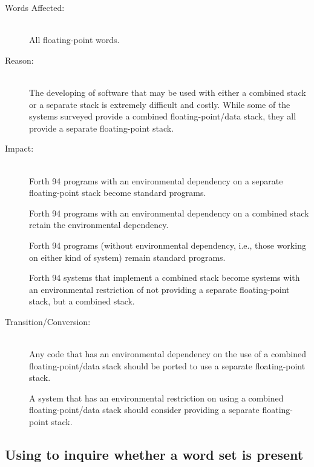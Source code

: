 \begin{description}
\item[Words Affected:] ~\\
	All floating-point words.

\item[Reason:] ~\\
	The developing of software that may be used with either a combined
	stack or a separate stack is extremely difficult and costly.  While
	some of the systems surveyed provide a combined floating-point/data
	stack, they all provide a separate floating-point stack.

\item[Impact:] ~\\
	Forth 94 programs with an environmental dependency on a separate
	floating-point stack become standard programs.

	Forth 94 programs with an environmental dependency on a combined
	stack retain the environmental dependency.

	Forth 94 programs (without environmental dependency, i.e., those
	working on either kind of system) remain standard programs.



	Forth 94 systems that implement a combined stack become systems
	with an environmental restriction of not providing a separate
	floating-point stack, but a combined stack.

\item[Transition/Conversion:] ~\\
	Any code that has an environmental dependency on the use of a
	combined floating-point/data stack should be ported to use a
	separate floating-point stack.

	A system that has an environmental restriction on using a combined
	floating-point/data stack should consider providing a separate
	floating-point stack.
\end{description}


\subsection[Using ENVIRONMENT? to inquire whether a word set is present]{Using  to inquire whether a word set is present} %
\label{diff:environment}

